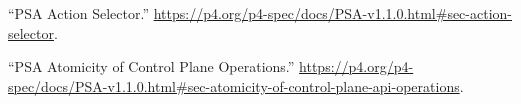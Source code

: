 \documentclass[11pt]{article}
\begin{document}
{{\begin{thebibliography}{38}
\mdbibitemlabel{{}[21]}\textquotedblleft{}PSA Action Selector.\textquotedblright{} \href{https://p4.org/p4-spec/docs/PSA-v1.1.0.html\%23sec-action-selector}{{\ttfamily https://\hspace{0pt}p4.\hspace{0pt}org/\hspace{0pt}p4-\hspace{0pt}spec/\hspace{0pt}docs/\hspace{0pt}PSA-\hspace{0pt}v1.\hspace{0pt}1.\hspace{0pt}0.\hspace{0pt}html\#\hspace{0pt}sec-\hspace{0pt}action-\hspace{0pt}selector}}.\label{psaactionselector}%

\mdbibitemlabel{{}[22]}\textquotedblleft{}PSA Atomicity of Control Plane Operations.\textquotedblright{} \href{https://p4.org/p4-spec/docs/PSA-v1.1.0.html\%23sec-atomicity-of-control-plane-api-operations}{{\ttfamily https://\hspace{0pt}p4.\hspace{0pt}org/\hspace{0pt}p4-\hspace{0pt}spec/\hspace{0pt}docs/\hspace{0pt}PSA-\hspace{0pt}v1.\hspace{0pt}1.\hspace{0pt}0.\hspace{0pt}html\#\hspace{0pt}sec-\hspace{0pt}atomicity-\hspace{0pt}of-\hspace{0pt}control-\hspace{0pt}plane-\hspace{0pt}api-\hspace{0pt}operations}}.\label{psaatomicityofcontrolplaneops}%


\end{thebibliography}}}
\end{document}
